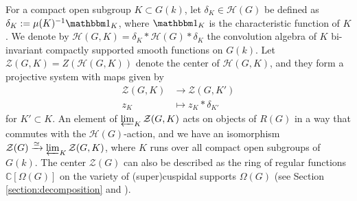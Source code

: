 \documentclass[11 pt]{article}
\numberwithin{equation}{subsection}
\theoremstyle{definition}
\theoremstyle{remark}
\theoremstyle{conjecture}
\newcommand{\mbm}{\mathbbm}
\newcommand{\C}{\mathbb C}
\newcommand{\HH}{\mathcal H}
\newcommand{\ZZ}{\mathcal{Z}}
\begin{document}
For a compact open subgroup $K \subset G(k)$, let $\delta_K \in \HH(G)$ be defined as $ \delta_K:= \mu(K)^{-1} \mbm 1_K$, where $\mbm 1_K$ is the characteristic function of $K$. We denote by $\HH(G,K)= \delta_K* \HH(G)*\delta_K$ the convolution algebra of $K$ bi-invariant compactly supported smooth functions on $G(k)$. Let $\ZZ(G,K)= Z(\HH(G,K))$ denote the center of $\HH(G,K)$, and they form a projective system with maps given by 
\begin{align*}
    \ZZ(G,K)& \rightarrow \ZZ(G,K')\\
    z_K &\mapsto z_K* \delta_{K'}
\end{align*}
for $K'\subset K$. An element of $\varprojlim_{K}\ZZ(G,K)$ acts on objects of $R(G)$ in a way that commutes with the $\HH(G)$-action, and we have an isomorphism $\ZZ(G) \xrightarrow{\simeq }\varprojlim_{K}\ZZ(G,K)$, where $K$ runs over all compact open subgroups of $G(k)$. The center $\ZZ(G)$ can also be described as the ring of regular functions $\C[\Omega(G)]$ on the variety of (super)cuspidal supports $\Omega(G)$ (see Section \ref{section:decomposition} and \cite[Section 3.3]{haines}). 
\end{document}
